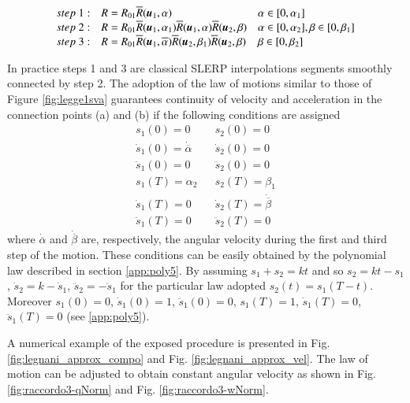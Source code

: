 \begin{equation}
    \begin{array}{lll}
        step\ 1: & R=R_{01}\overline{R}({\boldsymbol{u}}_1,\alpha) & \alpha \in [0, \alpha_1]\\
        
        step\ 2: & R=R_{01}\overline{R}({\boldsymbol{u}}_1,\alpha_1)\overline{R}({\boldsymbol{u}}_1,\alpha)\overline{R}({\boldsymbol{u}}_2,\beta) & \alpha \in [0, \alpha_2], \beta \in [0,\beta_1]\\
        
        step\ 3: &
        R=R_{01}\overline{R}({\boldsymbol{u}}_1,\overline{\alpha})\overline{R}({\boldsymbol{u}}_2,\beta_1)\overline{R}({\boldsymbol{u}}_2,\beta) & \beta \in [0, \beta_2]
    \end{array}
    \label{eq:3step}
\end{equation}

In practice steps 1 and 3 are classical SLERP interpolations segments smoothly connected by step 2. The adoption of the law of motions similar to those of Figure  \ref{fig:legge1sva} guarantees continuity of velocity and acceleration in the connection points (a) and (b) if the following  conditions are assigned
\begin{equation}
    \begin{array}{lcl}
        s_1(0)= 0 && s_2(0)=0\\
        \dot{s}_1(0)=\dot{\overline{\alpha}} && \dot{s}_2(0)=0 \\
        \ddot{s}_1(0)=0 && \ddot{s}_2(0)=0\\
        s_1(T)= \alpha_2 && s_2(T)=\beta_1\\
        \dot{s}_1(T)=0 && \dot{s}_2(T)=\dot{\overline{\beta}} \\
        \ddot{s}_1(T)=0 && \ddot{s}_2(T)=0
    \end{array}
    \label{eq:limits}
\end{equation}
where $\dot{\overline{\alpha}}$ and $\dot{\overline{\beta}}$ are, respectively, the angular velocity during the first and third step of the motion. These conditions can be easily obtained by the polynomial law described in section \ref{app:poly5}.
By assuming $s_1+s_2=k t$ and so $s_2=kt-s_1$, $\dot{s}_2=k-\dot{s}_1$, $\ddot{s}_2=-\ddot{s}_1$ for the particular law adopted $s_2(t)=s_1(T-t)$. Moreover $s_1(0)=0$, $\dot{s}_1(0)=1$, $\ddot{s}_1(0)=0$, $s_1(T)=1$,  $\dot{s}_1(T)=0$, $\ddot{s}_1(T)=0$ (see \ref{app:poly5}). 

A numerical example of the exposed procedure is presented in Fig. \ref{fig:legnani_approx_compo} and Fig. \ref{fig:legnani_approx_vel}. The law of motion can be adjusted to obtain constant angular velocity as shown in Fig. \ref{fig:raccordo3-qNorm} and Fig. \ref{fig:raccordo3-wNorm}.

